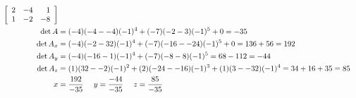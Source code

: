 \documentclass{letter}
\newcommand{\?}{\stackrel{?}{=}}
\newenvironment{Mat}[1]{%
  \left[\begin{array}{*{#1}{r}}
}{%
  \end{array}\right]
}
\begin{document}
\begin{enumerate}
\begin{enumerate}[label=(\alph*)]
{\begin{align*}
\begin{Mat}{3}
                             2 & -4 &  1 \\  
                             1 & -2 & -8 \end{Mat} \\
        \det A   &= (-4)(-4--4)(-1)^{4} + (-7)(-2-3)(-1)^{5} + 0 = -35 \\
        \det A_x &= (-4)(-2-32)(-1)^{4} + (-7)(-16--24)(-1)^{5} + 0 = 136 + 56 = 192 \\
        \det A_y &= (-4)(-16-1)(-1)^{4} + (-7)(-8-8)(-1)^{5} = 68 - 112 = -44 \\
        \det A_z &= (1)(32--2)(-1)^2 + (2)(-24--16)(-1)^3 + (1)(3--32)(-1)^4 = 34 + 16 + 35 = 85\\
        x &= \frac{192}{-35} ~~~~
        y = \frac{-44}{-35} ~~~~
        z = \frac{85}{-35}
    \end{align*}
     
}
\end{enumerate}
\end{enumerate}
\end{document}
